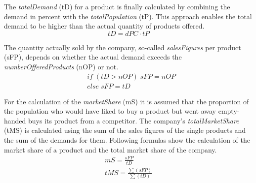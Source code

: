 The \textit{totalDemand} (\gls{tD}) for a product is finally calculated by combining the demand in percent with the \textit{totalPopulation} (\gls{tP}). This approach enables the total demand to be higher than the actual quantity of products offered.
\begin{equation}
\label{func:totalDemand}
tD= dPC \cdot tP    
\end{equation}

The quantity actually sold by the company, so-called \textit{salesFigures} per product (\gls{sFP}), depends on whether the actual demand exceeds the \textit{numberOfferedProducts} (\gls{nOP}) or not.
\begin{equation}
\label{func:salesFigure}
\begin{aligned}
& if \; ( tD > nOP ) \; { sFP = nOP } \\
& else \; { sFP = tD }    
\end{aligned}
\end{equation}

For the calculation of the \textit{marketShare} (\gls{mS}) it is assumed that the proportion of the population who would have liked to buy a product but went away empty-handed buys its product from a competitor. The company's \textit{totalMarketShare} (\gls{tMS}) is calculated using the sum of the sales figures of the single products and the sum of the demands for them. Following formulas show the calculation of the market share of a product and the total market share of the company.  
\begin{equation}
\label{func:marketShare}
\begin{aligned}
mS = \frac{sFP}{tD} \\
tMS = \frac{\sum(sFP)}{\sum(tD)}  
\end{aligned}
\end{equation}

